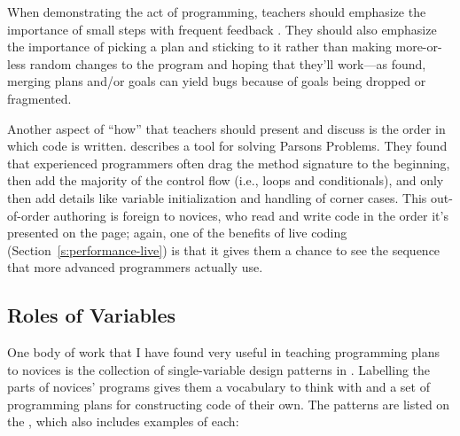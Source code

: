 When demonstrating the act of programming, teachers should emphasize the
importance of small steps with frequent feedback \cite{Blik2014}.
They should also emphasize the importance of picking a plan and sticking
to it rather than making more-or-less random changes to the program and
hoping that they'll work---as \cite{Spoh1985} found, merging plans
and/or goals can yield bugs because of goals being dropped or
fragmented.

Another aspect of ``how'' that teachers should present and discuss is the
order in which code is written. \cite{Ihan2011} describes a tool for
solving Parsons Problems. They found that experienced programmers often
drag the method signature to the beginning, then add the majority of the
control flow (i.e., loops and conditionals), and only then add details
like variable initialization and handling of corner cases. This
out-of-order authoring is foreign to novices, who read and write code in
the order it's presented on the page; again, one of the benefits of live
coding (Section~\ref{s:performance-live}) is that it gives them a chance
to see the sequence that more advanced programmers actually use.

\subsection*{Roles of Variables}

One body of work that I have found very useful in teaching programming
plans to novices is the collection of single-variable design patterns
in \cite{Kuit2004,Byck2005,Saja2006}. Labelling
the parts of novices' programs gives them a vocabulary to think with
and a set of programming plans for constructing code of their own. The
patterns are listed on the , which also includes examples of each:

